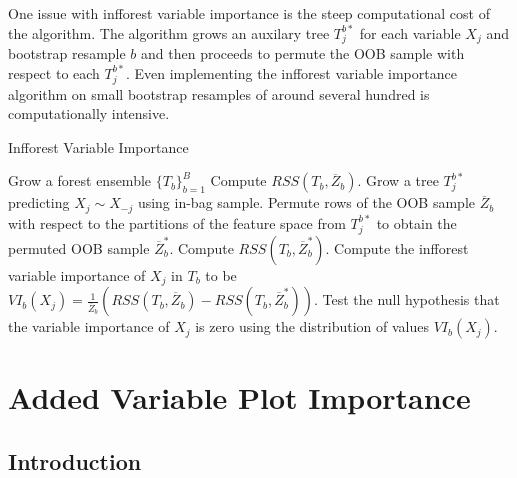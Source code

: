 \documentclass[12pt,twoside]{reedthesis}
\theoremstyle{definition}
\theoremstyle{definition}
\theoremstyle{definition}
\theoremstyle{remark}
\begin{document}
One issue with infforest variable importance is the steep computational
cost of the algorithm. The algorithm grows an auxilary tree
\(T_{j}^{b*}\) for each variable \(X_j\) and bootstrap resample \(b\)
and then proceeds to permute the OOB sample with respect to each
\(T_j^{b*}\). Even implementing the infforest variable importance
algorithm on small bootstrap resamples of around several hundred is
computationally intensive.
\begin{algorithm}
    \caption{Infforest Variable Importance} \label{infforest variable importance}
      \begin{algorithmic}[1]
        \State Grow a forest ensemble $\{T_b\}_{b=1}^B$
              \State Compute $RSS(T_b,\overline{Z}_b)$.
              \State Grow a tree $T_j^{b*}$ predicting $X_j\sim X_{-j}$ using in-bag sample.
              \State Permute rows of the OOB sample $\overline{Z}_b$ with respect to the partitions of the feature space from $T_j^{b*}$ to obtain the permuted OOB sample $\overline{Z}_b^*$. 
              \State Compute $RSS(T_b,\overline{Z}_b^*)$.
              \State Compute the infforest variable importance of $X_j$ in $T_b$ to be $VI_b(X_j)=\frac{1}{\overline{Z}_b}\left(RSS(T_b,\overline{Z}_b)-RSS(T_b,\overline{Z}_b^*)\right)$.  
            \EndFor
            \State Test the null hypothesis that the variable importance of $X_j$ is zero using the distribution of values $VI_b(X_j)$. 
          \EndFor
      \end{algorithmic}
  \end{algorithm}
\chapter{Added Variable Plot
Importance}\label{added-variable-plot-importance}

\section{Introduction}\label{introduction-2}
\end{document}
